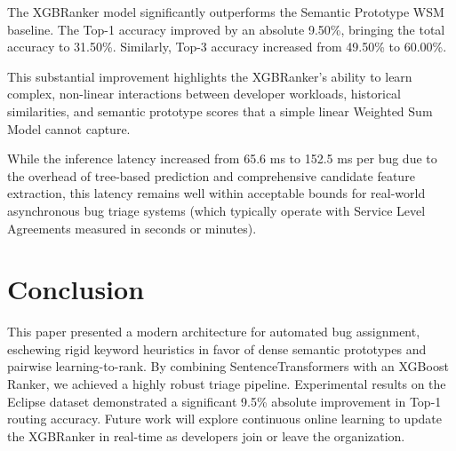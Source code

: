 \documentclass[conference]{IEEEtran}
\begin{document}
The XGBRanker model significantly outperforms the Semantic Prototype WSM baseline. The Top-1 accuracy improved by an absolute 9.50\%, bringing the total accuracy to 31.50\%. Similarly, Top-3 accuracy increased from 49.50\% to 60.00\%. 

This substantial improvement highlights the XGBRanker's ability to learn complex, non-linear interactions between developer workloads, historical similarities, and semantic prototype scores that a simple linear Weighted Sum Model cannot capture. 

While the inference latency increased from 65.6 ms to 152.5 ms per bug due to the overhead of tree-based prediction and comprehensive candidate feature extraction, this latency remains well within acceptable bounds for real-world asynchronous bug triage systems (which typically operate with Service Level Agreements measured in seconds or minutes).

\section{Conclusion}
This paper presented a modern architecture for automated bug assignment, eschewing rigid keyword heuristics in favor of dense semantic prototypes and pairwise learning-to-rank. By combining SentenceTransformers with an XGBoost Ranker, we achieved a highly robust triage pipeline. Experimental results on the Eclipse dataset demonstrated a significant 9.5\% absolute improvement in Top-1 routing accuracy. Future work will explore continuous online learning to update the XGBRanker in real-time as developers join or leave the organization.
\end{document}
